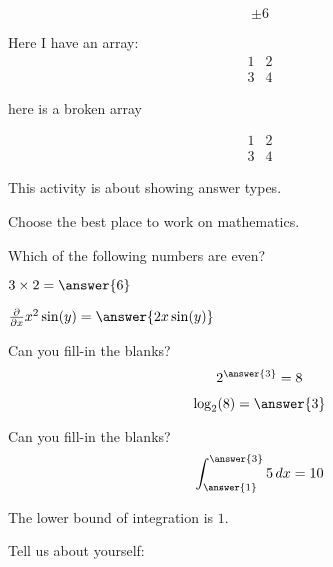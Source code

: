 \documentclass{ximera}
\begin{document}
\begin{onlineOnly}
  \begin{center}    
  \end{center}
\end{onlineOnly}








\[
\pm 6
\]

Here I have an array:
\[
\begin{array}{|c|c|}
  1 & 2 \\
  3 & 4
\end{array}
\]

here is a broken array

\[
\begin{array}{|c|c|}
  1 & 2 \\
  
  3 & 4
\end{array}
\]


This activity is about showing answer types.
\begin{problem}  
  Choose the best place to work on mathematics.  
  \begin{multipleChoice}  
  \end{multipleChoice}
\end{problem}


\begin{problem}  
  Which of the following numbers are even?  
  \begin{selectAll}  
  \end{selectAll}  
\end{problem}


\begin{problem}  
  $3\times 2 = \answer{6}$  
\end{problem} 

\begin{problem}  
  $\frac{\partial}{\partial x} x^2\sin(y) =  \answer{2x\sin(y)}$  
\end{problem} 

\begin{problem}
  Can you fill-in the blanks?
  \[
  2^{\answer{3}} = 8
  \]
  \begin{problem}
    \[
    \log_2(8) = \answer{3}
    \]
  \end{problem}
\end{problem}

\begin{problem}
  Can you fill-in the blanks?
  \[
  \int_{\answer{1}}^{\answer{3}}5 \, d x = 10
  \]
  \begin{hint}
    The lower bound of integration is $1$.
  \end{hint}
\end{problem}



\begin{problem}
  Tell us about yourself:
  \begin{freeResponse}
  \end{freeResponse}
\end{problem}
\end{document}
